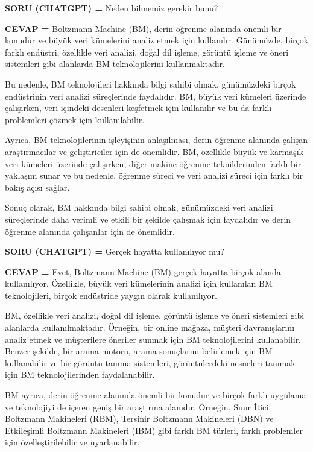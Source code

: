 \documentclass[11pt]{article}
\begin{document}
\textbf{SORU (CHATGPT) =} Neden bilmemiz gerekir bunu?

\textbf{CEVAP =} Boltzmann Machine (BM), derin öğrenme alanında önemli bir konudur ve büyük veri kümelerini analiz etmek için kullanılır. Günümüzde, birçok farklı endüstri, özellikle veri analizi, doğal dil işleme, görüntü işleme ve öneri sistemleri gibi alanlarda BM teknolojilerini kullanmaktadır.

Bu nedenle, BM teknolojileri hakkında bilgi sahibi olmak, günümüzdeki birçok endüstrinin veri analizi süreçlerinde faydalıdır. BM, büyük veri kümeleri üzerinde çalışırken, veri içindeki desenleri keşfetmek için kullanılır ve bu da farklı problemleri çözmek için kullanılabilir.

Ayrıca, BM teknolojilerinin işleyişinin anlaşılması, derin öğrenme alanında çalışan araştırmacılar ve geliştiriciler için de önemlidir. BM, özellikle büyük ve karmaşık veri kümeleri üzerinde çalışırken, diğer makine öğrenme tekniklerinden farklı bir yaklaşım sunar ve bu nedenle, öğrenme süreci ve veri analizi süreci için farklı bir bakış açısı sağlar.

Sonuç olarak, BM hakkında bilgi sahibi olmak, günümüzdeki veri analizi süreçlerinde daha verimli ve etkili bir şekilde çalışmak için faydalıdır ve derin öğrenme alanında çalışanlar için de önemlidir.

\textbf{SORU (CHATGPT) =} Gerçek hayatta kullanılıyor mu?

\textbf{CEVAP =} Evet, Boltzmann Machine (BM) gerçek hayatta birçok alanda kullanılıyor. Özellikle, büyük veri kümelerinin analizi için kullanılan BM teknolojileri, birçok endüstride yaygın olarak kullanılıyor.

BM, özellikle veri analizi, doğal dil işleme, görüntü işleme ve öneri sistemleri gibi alanlarda kullanılmaktadır. Örneğin, bir online mağaza, müşteri davranışlarını analiz etmek ve müşterilere öneriler sunmak için BM teknolojilerini kullanabilir. Benzer şekilde, bir arama motoru, arama sonuçlarını belirlemek için BM kullanabilir ve bir görüntü tanıma sistemleri, görüntülerdeki nesneleri tanımak için BM teknolojilerinden faydalanabilir.

BM ayrıca, derin öğrenme alanında önemli bir konudur ve birçok farklı uygulama ve teknolojiyi de içeren geniş bir araştırma alanıdır. Örneğin, Sınır İtici Boltzmann Makineleri (RBM), Tersinir Boltzmann Makineleri (DBN) ve Etkileşimli Boltzmann Makineleri (IBM) gibi farklı BM türleri, farklı problemler için özelleştirilebilir ve uyarlanabilir.
\end{document}

